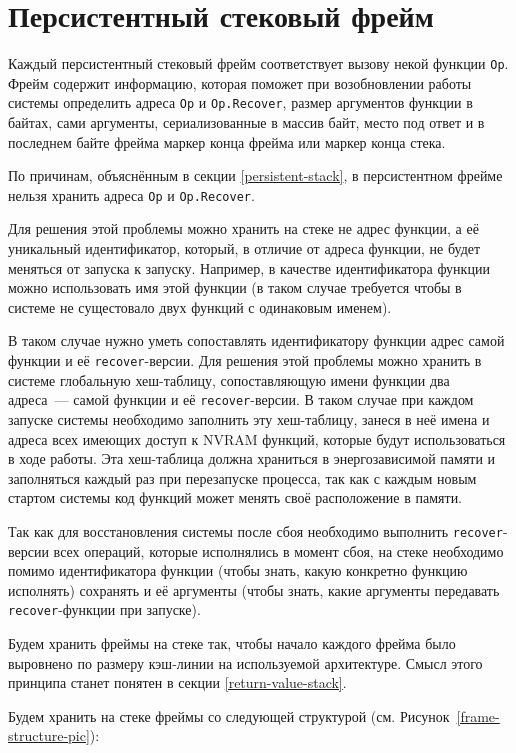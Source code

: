 \documentclass[times,specification,annotation]{itmo-student-thesis}
\begin{document}
\section{Персистентный стековый фрейм}

Каждый персистентный стековый фрейм соответствует вызову некой функции \texttt{Op}. Фрейм содержит информацию, которая поможет при возобновлении работы системы определить адреса \texttt{Op} и \texttt{Op.Recover}, размер аргументов функции в байтах, сами аргументы, сериализованные в массив байт, место под ответ и в последнем байте фрейма маркер конца фрейма или маркер конца стека.

По причинам, объяснённым в секции \ref{persistent-stack}, в персистентном фрейме нельзя хранить адреса \texttt{Op} и \texttt{Op.Recover}.

Для решения этой проблемы можно хранить на стеке не адрес функции, а её  уникальный идентификатор, который, в отличие от адреса функции, не будет меняться от запуска к запуску. Например, в качестве идентификатора функции можно использовать имя этой функции (в таком случае требуется чтобы в системе не сущестовало двух функций с одинаковым именем).

В таком случае нужно уметь сопоставлять идентификатору функции адрес самой функции и её \texttt{recover}-версии. Для решения этой проблемы можно хранить в системе глобальную хеш-таблицу, сопоставляющую имени функции два адреса~--- самой функции и её \texttt{recover}-версии. В таком случае при каждом запуске системы необходимо заполнить эту хеш-таблицу, занеся в неё имена и адреса всех имеющих доступ к NVRAM функций, которые будут использоваться в ходе работы. Эта хеш-таблица должна храниться в энергозависимой памяти и заполняться каждый раз при перезапуске процесса, так как с каждым новым стартом системы код функций может менять своё расположение в памяти.

Так как для восстановления системы после сбоя необходимо выполнить \texttt{recover}-версии всех операций, которые исполнялись в момент сбоя, на стеке необходимо помимо идентификатора функции (чтобы знать, какую конкретно функцию исполнять) сохранять и её аргументы (чтобы знать, какие аргументы передавать \texttt{recover}-функции при запуске).

Будем хранить фреймы на стеке так, чтобы начало каждого фрейма было выровнено по размеру кэш-линии на используемой архитектуре. Смысл этого принципа станет понятен в секции \ref{return-value-stack}.

Будем хранить на стеке фреймы со следующей структурой (см. Рисунок~\ref{frame-structure-pic}):
\end{document}
